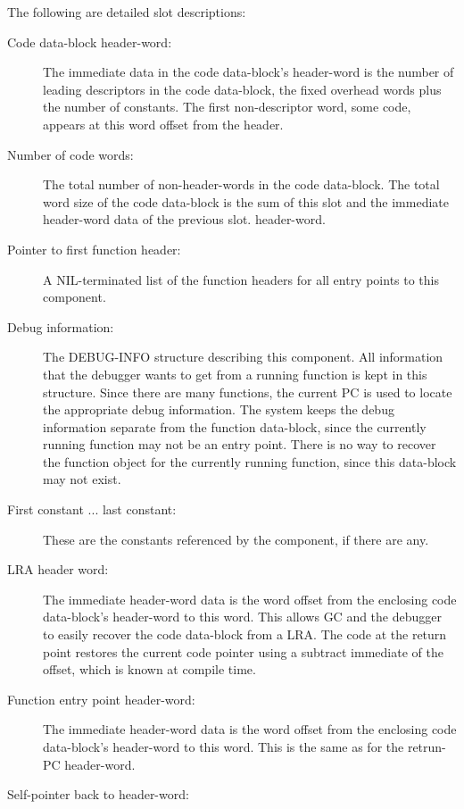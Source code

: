 The following are detailed slot descriptions:
\begin{description}
   \item[Code data-block header-word:]
      The immediate data in the code data-block's header-word is the number of
      leading descriptors in the code data-block, the fixed overhead words plus
      the number of constants.  The first non-descriptor word, some code,
      appears at this word offset from the header.
   \item[Number of code words:]
      The total number of non-header-words in the code data-block.  The total
      word size of the code data-block is the sum of this slot and the
      immediate header-word data of the previous slot.
      header-word.
   \item[Pointer to first function header:]
      A NIL-terminated list of the function headers for all entry points to
      this component.
   \item[Debug information:]
      The DEBUG-INFO structure describing this component.  All information that
      the debugger wants to get from a running function is kept in this
      structure.  Since there are many functions, the current PC is used to
      locate the appropriate debug information.  The system keeps the debug
      information separate from the function data-block, since the currently
      running function may not be an entry point.  There is no way to recover
      the function object for the currently running function, since this
      data-block may not exist.
   \item[First constant ... last constant:]
      These are the constants referenced by the component, if there are any.
\vspace{1ex}
   \item[LRA header word:]
      The immediate header-word data is the word offset from the enclosing code
      data-block's header-word to this word.  This allows GC and the debugger
      to easily recover the code data-block from a LRA.  The code at the
      return point restores the current code pointer using a subtract immediate
      of the offset, which is known at compile time.
\vspace{1ex}
   \item[Function entry point header-word:]
      The immediate header-word data is the word offset from the enclosing code
      data-block's header-word to this word.  This is the same as for the
      retrun-PC header-word.
   \item[Self-pointer back to header-word:]

\end{description}

